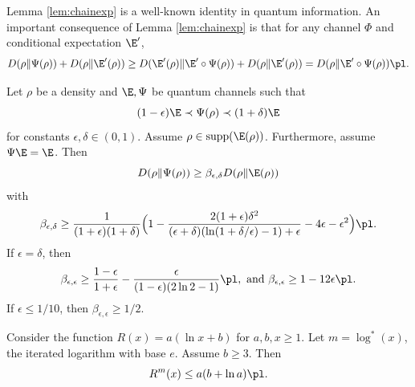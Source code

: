 Lemma \ref{lem:chainexp} is a well-known identity in quantum information. An important consequence of Lemma \ref{lem:chainexp} is that for any channel $\Phi$ and conditional expectation $\E'$,
\begin{equation} \label{eq:chain-iter}
    D(\rho \|\Psi(\rho)) + D(\rho \| \E'(\rho))
        \geq D(\E'(\rho) \| \E' \circ \Psi(\rho)) + D(\rho \| \E'(\rho))
    = D(\rho \| \E' \circ \Psi(\rho)) \pl.
\end{equation}
\begin{lemma}  \label{lem:revconv}
Let $\rho$ be a density and $\E,\Psi$ be quantum channels such that
\begin{equation}
    (1 - \epsilon) \E \prec \Psi(\rho) \prec (1 + \delta) \E
\end{equation}
for constants $\epsilon, \delta \in (0,1)$. Assume $\rho \in \text{supp}(\E(\rho))$. Furthermore, assume $\Psi \E = \E$. Then
\begin{equation}
D(\rho \| \Psi(\rho)) \geq \beta_{\epsilon, \delta} D(\rho \| \E(\rho))
\end{equation}
with
\begin{equation} \label{eq:simpleG} 
    \beta_{\epsilon, \delta} \geq \frac{1}{{(1 + \epsilon)(1 + \delta)}} \Big ( 1 - \frac{2 (1 + \epsilon) \delta^2}{(\epsilon + \delta)(\ln (1 + \delta / \epsilon) - 1) + \epsilon} - 4 \epsilon - \epsilon^2 \Big ) \pl.
\end{equation}
If $\epsilon = \delta$, then
\begin{equation}
    \beta_{\epsilon, \epsilon} \geq \frac{1-\epsilon}{1 + \epsilon} - \frac{\epsilon}{(1 - \epsilon) (2 \ln 2 - 1)} \pl, \text{ and } \beta_{\epsilon, \epsilon} \geq 1 - 12 \epsilon \pl.
\end{equation}
If $\epsilon \leq 1/10$, then $\beta_{\epsilon, \epsilon} \geq 1/2$.
\end{lemma}
\begin{lemma} \label{lem:log-iterate}
    Consider the function $R(x) = a (\ln x + b)$ for $a, b, x \geq 1$. Let $m = \log^*(x)$, the iterated logarithm with base $e$. Assume $b \geq 3$. Then
    \begin{equation}
        R^m(x) \leq a (b + \ln a) \pl.
    \end{equation}
\end{lemma}
